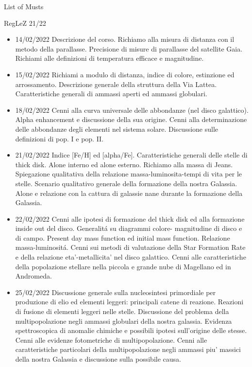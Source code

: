 
\begin{frame}[allowframebreaks]{List of Musts}
\end{frame}

\begin{frame}[allowframebreaks]{RegLeZ 21/22}
\begin{itemize}
\item 14/02/2022 Descrizione del corso. Richiamo alla misura di distanza con il metodo della parallasse. Precisione di misure di parallasse del satellite Gaia. Richiami alle definizioni di temperatura efficace e magnitudine.
\item 15/02/2022 Richiami a modulo di distanza, indice di colore, estinzione ed arrossamento. Descrizione generale della struttura della Via Lattea. Caratteristiche generali di ammassi aperti ed ammassi globulari.
\item 18/02/2022 Cenni alla curva universale delle abbondanze (nel disco galattico). Alpha enhancement e discussione della sua origine. Cenni alla determinazione delle abbondanze degli elementi nel sistema solare. Discussione sulle definizioni di pop. I e pop. II.
\item 21/02/2022 Indice [Fe/H] ed [alpha/Fe]. Caratteristiche generali delle stelle di thick disk. Alone interno ed alone esterno. Richiamo alla massa di Jeans. Spiegazione qualitativa della relazione massa-luminosita-tempi di vita per le stelle. Scenario qualitativo generale della formazione della nostra Galassia. Alone e relazione con la cattura di galassie nane durante la formazione della Galassia.
\item 22/02/2022 Cenni alle ipotesi di formazione del thick disk ed alla formazione inside out del disco. Generalit\'a su diagrammi colore- magnitudine di disco e di campo. Present day mass function ed initial mass function. Relazione massa-luminosit\'a. Cenni sui metodi di valutazione della Star Formation Rate e della relazione eta'-metallicita' nel disco galattico. Cenni alle caratteristiche della popolazione stellare nella piccola e grande nube di Magellano ed in Andromeda.
\item 25/02/2022 Discussione generale sulla nucleosintesi primordiale per produzione di elio ed elementi leggeri: principali catene di reazione. Reazioni di fusione di elementi leggeri nelle stelle. Discussione del problema della multipopolazione negli ammassi globulari della nostra galassia. Evidenza spettroscopica di anomalie chimiche e possibili ipotesi sull'origine delle stesse. Cenni alle evidenze fotometriche di multipopolazione. Cenni alle caratteristiche particolari della multipopolazione negli ammassi piu' massici della nostra Galassia e discussione sulla possibile causa.

\end{itemize}
\end{frame}

